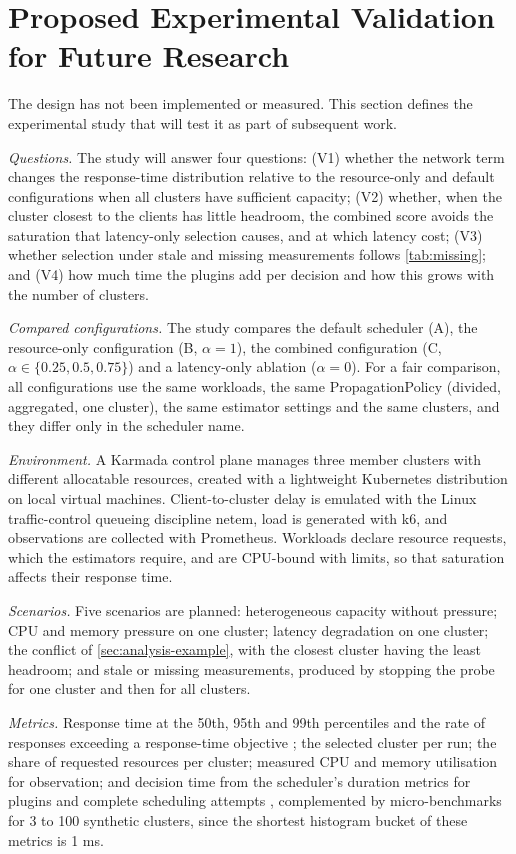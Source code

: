 \section{Proposed Experimental Validation for Future Research}\label{sec:validation}

The design has not been implemented or measured. This section defines the experimental study that will test it as part of subsequent work.

\emph{Questions.} The study will answer four questions: (V1) whether the network term changes the response-time distribution relative to the resource-only and default configurations when all clusters have sufficient capacity; (V2) whether, when the cluster closest to the clients has little headroom, the combined score avoids the saturation that latency-only selection causes, and at which latency cost; (V3) whether selection under stale and missing measurements follows \cref{tab:missing}; and (V4) how much time the plugins add per decision and how this grows with the number of clusters.

\emph{Compared configurations.} The study compares the default scheduler (A), the resource-only configuration (B, $\alpha = 1$), the combined configuration (C, $\alpha \in \{0.25, 0.5, 0.75\}$) and a latency-only ablation ($\alpha = 0$). For a fair comparison, all configurations use the same workloads, the same PropagationPolicy (divided, aggregated, one cluster), the same estimator settings and the same clusters, and they differ only in the scheduler name.

\emph{Environment.} A Karmada control plane manages three member clusters with different allocatable resources, created with a lightweight Kubernetes distribution on local virtual machines. Client-to-cluster delay is emulated with the Linux traffic-control queueing discipline netem, load is generated with k6, and observations are collected with Prometheus. Workloads declare resource requests, which the estimators require, and are CPU-bound with limits, so that saturation affects their response time.

\emph{Scenarios.} Five scenarios are planned: heterogeneous capacity without pressure; CPU and memory pressure on one cluster; latency degradation on one cluster; the conflict of \cref{sec:analysis-example}, with the closest cluster having the least headroom; and stale or missing measurements, produced by stopping the probe for one cluster and then for all clusters.

\emph{Metrics.} Response time at the 50th, 95th and 99th percentiles and the rate of responses exceeding a response-time objective \cite{dean2013tail}; the selected cluster per run; the share of requested resources per cluster; measured CPU and memory utilisation for observation; and decision time from the scheduler's duration metrics for plugins and complete scheduling attempts \cite{karmada_repo}, complemented by micro-benchmarks for 3 to 100 synthetic clusters, since the shortest histogram bucket of these metrics is 1 ms.

